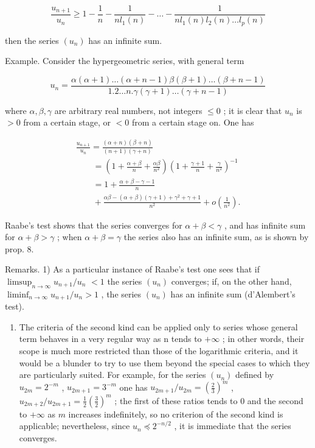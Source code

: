 \[
\frac {u _ {n + 1}}{u _ {n}} \geqslant 1 - \frac {1}{n} - \frac {1}{n l _ {1} (n)} - \dots - \frac {1}{n l _ {1} (n) l _ {2} (n) \dots l _ {p} (n)}
\]

then the series \((u_{n})\) has an infinite sum.

Example. Consider the hypergeometric series, with general term

\[
u _ {n} = \frac {\alpha (\alpha + 1) \dots (\alpha + n - 1) \beta (\beta + 1) \dots (\beta + n - 1)}{1 . 2 \dots n . \gamma (\gamma + 1) \dots (\gamma + n - 1)}
\]

where \(\alpha, \beta, \gamma\) are arbitrary real numbers, not integers \(\leqslant 0\) ; it is clear that \(u_{n}\) is \(>0\) from a certain stage, or \(< 0\) from a certain stage on. One has

\[
\begin{array}{l} \frac {u _ {n + 1}}{u _ {n}} = \frac {(\alpha + n) (\beta + n)}{(n + 1) (\gamma + n)} \\ \qquad = \left(1 + \frac {\alpha + \beta}{n} + \frac {\alpha \beta}{n ^ {2}}\right) \left(1 + \frac {\gamma + 1}{n} + \frac {\gamma}{n ^ {2}}\right) ^ {- 1} \\ \qquad = 1 + \frac {\alpha + \beta - \gamma - 1}{n} \\ \qquad + \frac {\alpha \beta - (\alpha + \beta) (\gamma + 1) + \gamma^ {2} + \gamma + 1}{n ^ {2}} + o \left(\frac {1}{n ^ {2}}\right). \end{array}
\]

Raabe's test shows that the series converges for \(\alpha +\beta <  \gamma\) , and has infinite sum for \(\alpha +\beta >\gamma\) ; when \(\alpha +\beta = \gamma\) the series also has an infinite sum, as is shown by prop. 8.

Remarks. 1) As a particular instance of Raabe's test one sees that if \(\limsup_{n\to \infty}u_{n + 1} / u_n\) \(< 1\) the series \((u_{n})\) converges; if, on the other hand, \(\liminf_{n\to \infty}u_{n + 1} / u_n > 1\) , the series \((u_{n})\) has an infinite sum (d'Alembert's test).

\begin{enumerate}
\def\labelenumi{\arabic{enumi})}
\setcounter{enumi}{1}
\tightlist
\item
  The criteria of the second kind can be applied only to series whose general term behaves in a very regular way as n tends to \(+\infty\) ; in other words, their scope is much more restricted than those of the logarithmic criteria, and it would be a blunder to try to use them beyond the special cases to which they are particularly suited. For example, for the series \((u_{n})\) defined by \(u_{2m} = 2^{-m}\) , \(u_{2m + 1} = 3^{-m}\) one has \(u_{2m + 1} / u_{2m} = \left(\frac{2}{3}\right)^{m}\) , \(u_{2m + 2} / u_{2m + 1} = \frac{1}{2}\left(\frac{3}{2}\right)^{m}\) ; the first of these ratios tends to 0 and the second to \(+\infty\) as \(m\) increases indefinitely, so no criterion of the second kind is applicable; nevertheless, since \(u_{n} \preccurlyeq 2^{-n / 2}\) , it is immediate that the series converges.
\end{enumerate}

